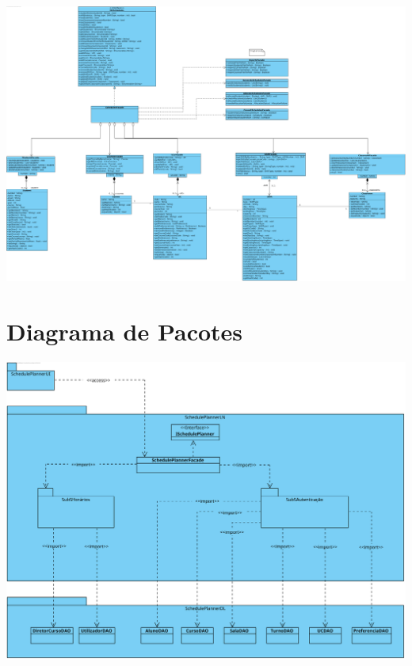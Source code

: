 \documentclass[a4paper,12pt]{scrreprt}
\begin{document}
\begin{minipage}{\textwidth}
    \centering
    \includegraphics[width=1.5\textwidth, angle=270]{images/class-diagrams/3-schedules.png}
    \label{fig:5-3-subsistema_horarios}
\end{minipage}



\chapter{Diagrama de Pacotes}
\vspace{1cm}

\begin{minipage}{\textwidth}
    \centering
    \includegraphics[width=1\textwidth]{images/packages-diagram.png}
    \label{fig:6-1-diagrama_de_pacotes}
\end{minipage}
\end{document}
